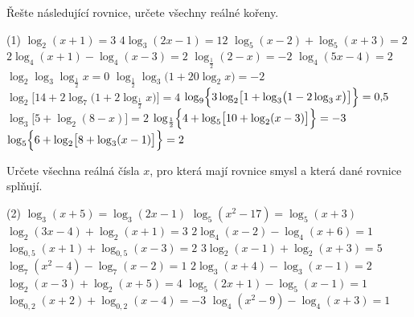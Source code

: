 \documentclass[12pt,a4paper]{article}
\begin{document}
\begin{exercise}
    Řešte následující rovnice, určete všechny reálné kořeny.
    \begin{tasks}(1)
        \task $\log_{2}(x+1) = 3$
        \task $4\log_{3}(2x-1) = 12$
        \task $\log_{5}(x-2) + \log_{5}(x+3) = 2$
        \task $2\log_{4}(x+1) - \log_{4}(x-3) = 2$
        \task $\log_{\frac12}(2-x) = -2$
        \task $\log_{4}(5x-4) = 2$
        \task $\log_{2}\log_{3}\log_{\frac12} x = 0$
        \task $\log_{\frac12}\log_{3}\bigl(1 + 20\log_{2} x\bigr) = -2$
        \task $\log_{2}\bigl[14 + 2\log_{7}\bigl(1 + 2\log_{\frac12} x\bigr)\bigr] = 4$
        \task $\log_{9}\Bigl\{3\log_{2}\bigl[1 + \log_{3}\bigl(1 - 2\log_{3} x\bigr)\bigr]\Bigr\} = 0{,}5$
        \task $\log_{3}\bigl[5 + \log_{2}(8 - x)\bigr] = 2$
        \task $\log_{\frac12}\Bigl\{4 + \log_{5}\bigl[10 + \log_{2}(x - 3)\bigr]\Bigr\} = -3$
        \task $\log_{5}\Bigl\{6 + \log_{2}\bigl[8 + \log_{3}(x - 1)\bigr]\Bigr\} = 2$
    \end{tasks}
\end{exercise}


\begin{exercise}
    Určete všechna reálná čísla $x$, pro která mají rovnice smysl a která dané rovnice splňují.
    \begin{tasks}(2)
        \task $\log_3(x+5) = \log_3(2x-1)$
        \task $\log_5(x^2 - 17) = \log_5(x+3)$
        \task $\log_2(3x - 4) + \log_2(x + 1) = 3$
        \task $2\log_4(x - 2) - \log_4(x + 6) = 1$
        \task $\log_{0{,}5}(x + 1) + \log_{0{,}5}(x - 3) = 2$
        \task $3\log_2(x - 1) + \log_2(x + 3) = 5$
        \task $\log_7(x^2 - 4) - \log_7(x - 2) = 1$
        \task $2\log_3(x + 4) - \log_3(x - 1) = 2$
        \task $\log_{2}(x - 3) + \log_{2}(x + 5) = 4$
        \task $ \log_{5}(2x + 1) - \log_{5}(x - 1) = 1$
        \task $\log_{0{,}2}(x + 2) + \log_{0{,}2}(x - 4) = -3$
        \task $ \log_{4}(x^2 - 9) - \log_{4}(x + 3) = 1$
    \end{tasks}
\end{exercise}
\end{document}
